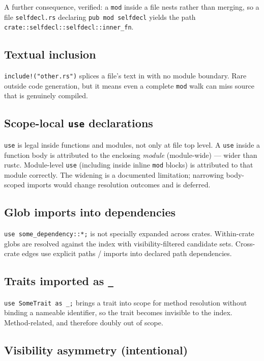 \documentclass[11pt,a4paper]{article}
\begin{document}
A further consequence, verified: a \verb|mod| inside a file nests rather than
merging, so a file \verb|selfdecl.rs| declaring \verb|pub mod selfdecl| yields the
path \verb|crate::selfdecl::selfdecl::inner_fn|.

\subsection{Textual inclusion}

\verb|include!("other.rs")| splices a file's text in with no module boundary.
Rare outside code generation, but it means even a complete \verb|mod| walk can
miss source that is genuinely compiled.

\subsection{Scope-local \texttt{use} declarations}

\verb|use| is legal inside functions and modules, not only at file top level.
A \verb|use| inside a function body is attributed to the enclosing
\emph{module} (module-wide) --- wider than rustc. Module-level \verb|use|
(including inside inline \verb|mod| blocks) is attributed to that module
correctly. The widening is a documented limitation; narrowing body-scoped
imports would change resolution outcomes and is deferred.

\subsection{Glob imports into dependencies}

\verb|use some_dependency::*;| is not specially expanded across crates.
Within-crate globs are resolved against the index with visibility-filtered
candidate sets. Cross-crate edges use explicit paths / imports into declared
path dependencies.

\subsection{Traits imported as \texttt{\_}}

\verb|use SomeTrait as _;| brings a trait into scope for method resolution
without binding a nameable identifier, so the trait becomes invisible to the
index. Method-related, and therefore doubly out of scope.

\subsection{Visibility asymmetry (intentional)}
\end{document}
